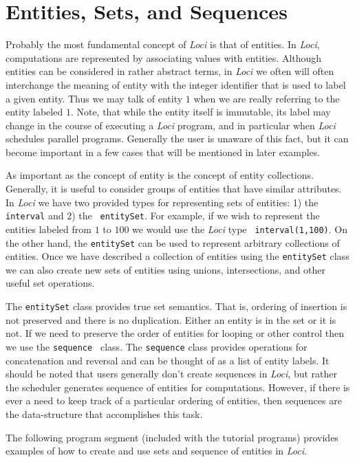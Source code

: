 \documentclass[10pt,epsf,letterpaper,twoside]{book}
\begin{document}
\section{Entities, Sets, and Sequences}

Probably the most fundamental concept of {\it Loci} is that of entities.  In
{\it Loci}, computations are represented by associating values with
entities.  Although entities can be considered in rather abstract
terms, in {\it Loci} we often will often interchange the meaning of entity
with the integer identifier that is used to label a given entity.
Thus we may talk of entity $1$ when we are really referring to the
entity labeled $1$.  Note, that while the entity itself is immutable,
its label may change in the course of executing a {\it Loci} program, and in
particular when {\it Loci} schedules parallel programs.  Generally the user
is unaware of this fact, but it can become important in a few cases
that will be mentioned in later examples.

As important as the concept of entity is the concept of entity
collections.  Generally, it is useful to consider groups of entities
that have similar attributes.  In {\it Loci} we have two provided types for
representing sets of entities: 1) the {\tt interval} and 2) the {\tt
  entitySet}.  For example, if we wish to represent the entities
labeled from $1$ to $100$ we would use the {\it Loci} type {\tt
  interval(1,100)}.  On the other hand, the {\tt entitySet} can be
used to represent arbitrary collections of entities.  Once we have
described a collection of entities using the {\tt entitySet} class we
can also create new sets of entities using unions, intersections, and
other useful set operations.

The {\tt entitySet} class provides true set semantics.
That is, ordering of insertion is not preserved and there is no
duplication.  Either an entity is in the set or it is not.  If we need
to preserve the order of entities for looping or other control then we
use the {\tt sequence } class.  The {\tt sequence} class provides
operations for concatenation and reversal and can be thought
of as a list of entity labels.  It should be noted that users
generally don't create sequences in {\it Loci}, but rather the scheduler
generates sequence of entities for computations.  However, if there is
ever a need to keep track of a particular ordering of entities, then
sequences are the data-structure that accomplishes this task.

The following program segment (included with the tutorial programs)
provides examples of how to create and use sets and sequence of
entities in {\it Loci}.
\end{document}
